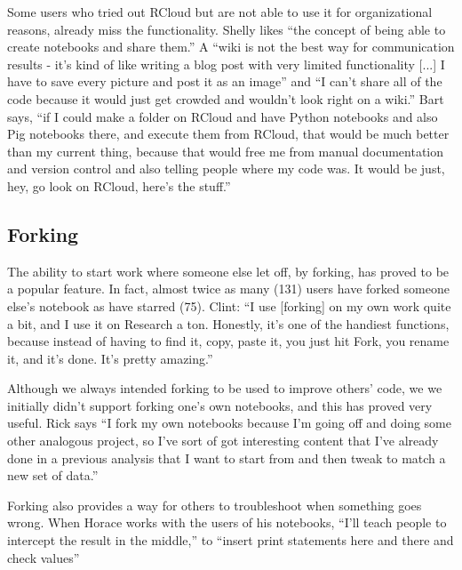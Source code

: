Some users who tried out RCloud but are not able to use it for organizational
reasons, already miss the functionality. Shelly likes
``the concept of being able to create notebooks and share them.'' A ``wiki is not the
best way for communication results - it's kind of like writing a blog post with
very limited functionality [...] I have to save every
picture and post it as an image'' and ``I can't share all of the code because it
would just get crowded and wouldn't look right on a wiki.'' Bart says, ``if I could
make a folder on
RCloud and have Python notebooks and also Pig notebooks there, and execute them
from RCloud, that would be much better than my current thing, because that would
free me from manual documentation and version control and also telling people
where my code was. It would be just, hey, go look on RCloud, here's the stuff.''



\subsection{Forking}
The ability to start work where someone else let off, by forking, has proved to
be a popular feature. In fact, almost twice as many (131) users have forked
someone else's notebook as have starred (75).  Clint: ``I use [forking] on my
own work quite a bit, and I use it on Research a ton. Honestly, it's one of the
handiest functions, because instead of having to find it, copy, paste it, you
just hit Fork, you rename it, and it's done. It's pretty amazing.''

Although we always intended forking to be used to improve others' code, we we
initially didn't support forking one's own notebooks, and this has proved very
useful. Rick says ``I fork my own notebooks because I'm going off and doing some
other analogous project, so I've sort of got interesting content that I've
already done in a previous analysis that I want to start from and then tweak to
match a new set of data.''

Forking also provides a way for others to troubleshoot when something goes
wrong.  When Horace works with the users of his notebooks, ``I'll teach people to intercept the result in the
middle,'' to ``insert print statements here and there and check values''

